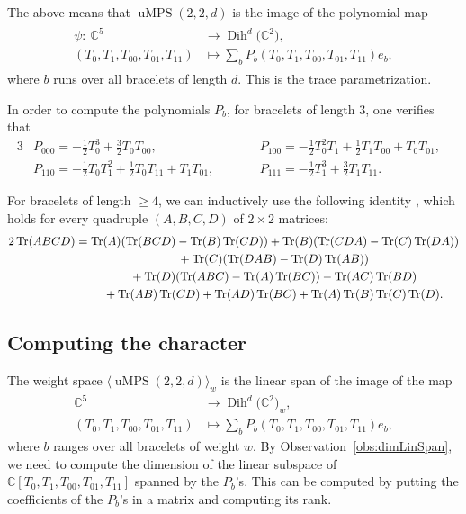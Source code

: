 \documentclass[10pt,a4paper]{amsart}
\numberwithin{equation}{section}
\DeclareMathOperator{\Tr}{Tr}
\newcommand{\CC}{\mathbb{C}}
\DeclareMathOperator{\uMPS}{uMPS}
\DeclareMathOperator{\Dih}{Dih}
\begin{document}
 The above means that $\uMPS(2,2,d)$ is the image of the polynomial map
 \begin{align} \label{eq:traceParMap}
 \begin{split}
     \psi\colon \  \CC^5 &\to \Dih^d\big(\CC^2\big), \\
     (T_0,T_1,T_{00},T_{01},T_{11})& \mapsto \sum_{b}{P_b(T_0,T_1,T_{00},T_{01},T_{11})e_b},
     \end{split}
 \end{align}
 where $b$ runs over all bracelets of length $d$. This is the trace parametrization.

 In order to compute the polynomials $P_b$, for bracelets of length $3$, one verifies that
 \begin{alignat*}{3}
 &   P_{000}= -\frac{1}{2}T_0^3 + \frac{3}{2}T_0T_{00},\qquad& &
    P_{100}= -\frac{1}{2}T_0^2T_1 + \frac{1}{2}T_1T_{00}+ T_0T_{01}, &\\
&    P_{110}= -\frac{1}{2}T_0T_1^2 + \frac{1}{2}T_0T_{11}+ T_1T_{01},\qquad & &
    P_{111}= -\frac{1}{2}T_1^3 + \frac{3}{2}T_1T_{11}.&
 \end{alignat*}

For bracelets of length $\geq 4$, we can inductively use the following identity \cite{sibirskii1968algebraic}, which holds for every quadruple $(A,B,C,D)$ of $2 \times 2$ matrices:
\begin{gather*}
    2\Tr(ABCD) = \Tr(A) (\Tr(BCD) - \Tr(B)\Tr(CD) ) + \Tr(B) (\Tr(CDA) - \Tr(C)\Tr(DA) ) \nonumber\\
  \hphantom{2\Tr(ABCD) =}{}   + \Tr(C) (\Tr(DAB) - \Tr(D)\Tr(AB) ) \nonumber \\
  \hphantom{2\Tr(ABCD) =}{} + \Tr(D) (\Tr(ABC) - \Tr(A)\Tr(BC) ) -\Tr(AC)\Tr(BD)\\ %
\hphantom{2\Tr(ABCD) =}{} + \Tr(AB)\Tr(CD) + \Tr(AD)\Tr(BC)  + \Tr(A)\Tr(B)\Tr(C)\Tr(D).  \nonumber
\end{gather*}

\subsection{Computing the character}\label{subsec: char}
 The weight space
 $\langle \uMPS(2,2,d) \rangle_w$
 is the linear span of the image of the map
\begin{align*}
     \CC^5 &\to \Dih^d\big(\CC^2\big)_w ,\\
     (T_0,T_1,T_{00},T_{01},T_{11})& \mapsto \sum_{b}{P_b(T_0,T_1,T_{00},T_{01},T_{11})e_b},
 \end{align*}
 where $b$ ranges over all bracelets of weight $w$. By Observation~\ref{obs:dimLinSpan}, we need to compute the dimension of the linear subspace of $\CC[T_0,T_1,T_{00},T_{01},T_{11}]$ spanned by the $P_b$'s. This can be computed by putting the coefficients of the $P_b$'s in a matrix and computing its rank.
\end{document}
